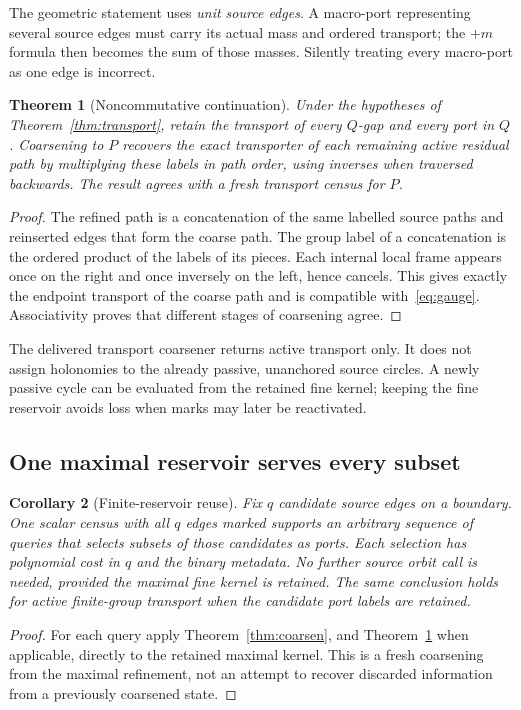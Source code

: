 \documentclass[11pt]{article}
\newtheorem{theorem}{Theorem}[section]
\newtheorem{corollary}[theorem]{Corollary}
\theoremstyle{definition}\newtheorem{definition}[theorem]{Definition}\newtheorem{example}[theorem]{Example}
\theoremstyle{remark}\newtheorem{remark}[theorem]{Remark}
\begin{document}
The geometric statement uses \emph{unit source edges}. A macro-port representing several source edges must carry its actual mass and ordered transport; the $+m$ formula then becomes the sum of those masses. Silently treating every macro-port as one edge is incorrect.

\begin{theorem}[Noncommutative continuation]
\label{thm:groupcoarsen}
Under the hypotheses of Theorem~\ref{thm:transport}, retain the transport of every $Q$-gap and every port in $Q$. Coarsening to $P$ recovers the exact transporter of each remaining active residual path by multiplying these labels in path order, using inverses when traversed backwards. The result agrees with a fresh transport census for $P$.
\end{theorem}
\begin{proof}
The refined path is a concatenation of the same labelled source paths and reinserted edges that form the coarse path. The group label of a concatenation is the ordered product of the labels of its pieces. Each internal local frame appears once on the right and once inversely on the left, hence cancels. This gives exactly the endpoint transport of the coarse path and is compatible with~\eqref{eq:gauge}. Associativity proves that different stages of coarsening agree.
\end{proof}

The delivered transport coarsener returns active transport only. It does not assign holonomies to the already passive, unanchored source circles. A newly passive cycle can be evaluated from the retained fine kernel; keeping the fine reservoir avoids loss when marks may later be reactivated.

\subsection{One maximal reservoir serves every subset}
\begin{corollary}[Finite-reservoir reuse]
\label{cor:reservoir}
Fix $q$ candidate source edges on a boundary. One scalar census with all $q$ edges marked supports an arbitrary sequence of queries that selects subsets of those candidates as ports. Each selection has polynomial cost in $q$ and the binary metadata. No further source orbit call is needed, provided the maximal fine kernel is retained. The same conclusion holds for active finite-group transport when the candidate port labels are retained.
\end{corollary}
\begin{proof}
For each query apply Theorem~\ref{thm:coarsen}, and Theorem~\ref{thm:groupcoarsen} when applicable, directly to the retained maximal kernel. This is a fresh coarsening from the maximal refinement, not an attempt to recover discarded information from a previously coarsened state.
\end{proof}
\end{document}
